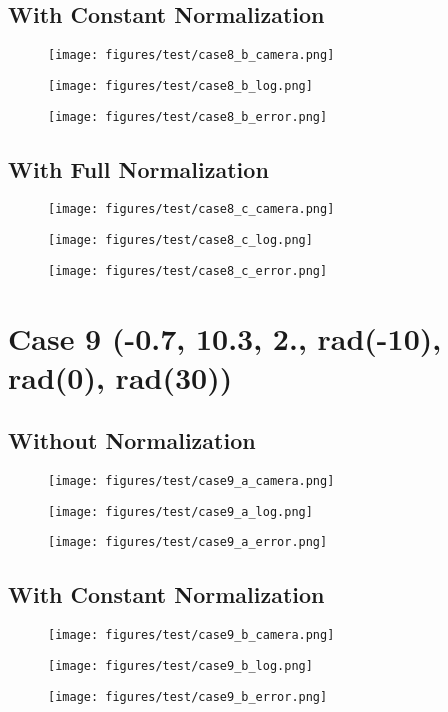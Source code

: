 \subsection{With Constant Normalization}
\begin{figure}[ht!] \centering \texttt{[image: figures/test/case8\_b\_camera.png]} \end{figure}
\begin{figure}[ht!] \centering \texttt{[image: figures/test/case8\_b\_log.png]} \end{figure}
\begin{figure}[ht!] \centering \texttt{[image: figures/test/case8\_b\_error.png]} \end{figure}
\clearpage
\subsection{With Full Normalization}
\begin{figure}[ht!] \centering \texttt{[image: figures/test/case8\_c\_camera.png]} \end{figure}
\begin{figure}[ht!] \centering \texttt{[image: figures/test/case8\_c\_log.png]} \end{figure}
\begin{figure}[ht!] \centering \texttt{[image: figures/test/case8\_c\_error.png]} \end{figure}
\clearpage

\section{Case 9 (-0.7, 10.3, 2., rad(-10), rad(0), rad(30))}
\subsection{Without Normalization}
\begin{figure}[ht!] \centering \texttt{[image: figures/test/case9\_a\_camera.png]} \end{figure}
\begin{figure}[ht!] \centering \texttt{[image: figures/test/case9\_a\_log.png]} \end{figure}
\begin{figure}[ht!] \centering \texttt{[image: figures/test/case9\_a\_error.png]} \end{figure}
\clearpage
\subsection{With Constant Normalization}
\begin{figure}[ht!] \centering \texttt{[image: figures/test/case9\_b\_camera.png]} \end{figure}
\begin{figure}[ht!] \centering \texttt{[image: figures/test/case9\_b\_log.png]} \end{figure}
\begin{figure}[ht!] \centering \texttt{[image: figures/test/case9\_b\_error.png]} \end{figure}
\clearpage
